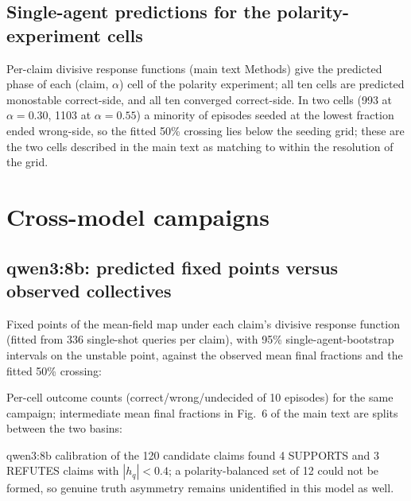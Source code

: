 \documentclass[11pt]{article}
\begin{document}
\subsection{Single-agent predictions for the polarity-experiment cells}

Per-claim divisive response functions (main text Methods) give the predicted
phase of each (claim, $\alpha$) cell of the polarity experiment; all ten cells
are predicted monostable correct-side, and all ten converged correct-side.
In two cells (993 at $\alpha = 0.30$, 1103 at $\alpha = 0.55$) a minority of
episodes seeded at the lowest fraction ended wrong-side, so the fitted 50\%
crossing lies below the seeding grid; these are the two cells described in
the main text as matching to within the resolution of the grid.
\begin{center}
\small
\resizebox{\textwidth}{!}{}
\end{center}

\section{Cross-model campaigns}

\subsection{qwen3:8b: predicted fixed points versus observed collectives}

Fixed points of the mean-field map under each claim's divisive response
function (fitted from 336 single-shot queries per claim), with 95\%
single-agent-bootstrap intervals on the unstable point, against the observed
mean final fractions and the fitted 50\% crossing:
\begin{center}
\footnotesize
\resizebox{\textwidth}{!}{}
\end{center}

Per-cell outcome counts (correct/wrong/undecided of 10 episodes) for the same
campaign; intermediate mean final fractions in Fig.~6 of the main text are
splits between the two basins:
\begin{center}
\small

\end{center}

qwen3:8b calibration of the 120 candidate claims found 4 SUPPORTS and 3
REFUTES claims with $|h_q| < 0.4$; a polarity-balanced set of 12 could not be
formed, so genuine truth asymmetry remains unidentified in this model as
well.
\end{document}
